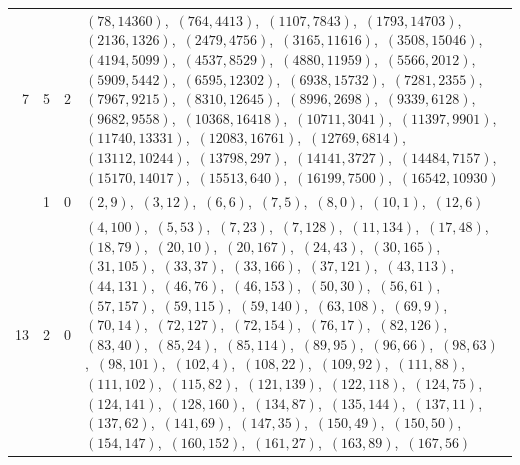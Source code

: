 \documentclass[11pt]{article}
\begin{document}
\begin{longtable}{@{}rrl>{\raggedright\arraybackslash}p{}@{}}
7 & 5 & $2$ & $(78,14360)$,\allowbreak\ $(764,4413)$,\allowbreak\ $(1107,7843)$,\allowbreak\ $(1793,14703)$,\allowbreak\ $(2136,1326)$,\allowbreak\ $(2479,4756)$,\allowbreak\ $(3165,11616)$,\allowbreak\ $(3508,15046)$,\allowbreak\ $(4194,5099)$,\allowbreak\ $(4537,8529)$,\allowbreak\ $(4880,11959)$,\allowbreak\ $(5566,2012)$,\allowbreak\ $(5909,5442)$,\allowbreak\ $(6595,12302)$,\allowbreak\ $(6938,15732)$,\allowbreak\ $(7281,2355)$,\allowbreak\ $(7967,9215)$,\allowbreak\ $(8310,12645)$,\allowbreak\ $(8996,2698)$,\allowbreak\ $(9339,6128)$,\allowbreak\ $(9682,9558)$,\allowbreak\ $(10368,16418)$,\allowbreak\ $(10711,3041)$,\allowbreak\ $(11397,9901)$,\allowbreak\ $(11740,13331)$,\allowbreak\ $(12083,16761)$,\allowbreak\ $(12769,6814)$,\allowbreak\ $(13112,10244)$,\allowbreak\ $(13798,297)$,\allowbreak\ $(14141,3727)$,\allowbreak\ $(14484,7157)$,\allowbreak\ $(15170,14017)$,\allowbreak\ $(15513,640)$,\allowbreak\ $(16199,7500)$,\allowbreak\ $(16542,10930)$\\
\addlinespace[3pt]
13 & 1 & $0$ & $(2,9)$,\allowbreak\ $(3,12)$,\allowbreak\ $(6,6)$,\allowbreak\ $(7,5)$,\allowbreak\ $(8,0)$,\allowbreak\ $(10,1)$,\allowbreak\ $(12,6)$\\
13 & 2 & $0$ & $(4,100)$,\allowbreak\ $(5,53)$,\allowbreak\ $(7,23)$,\allowbreak\ $(7,128)$,\allowbreak\ $(11,134)$,\allowbreak\ $(17,48)$,\allowbreak\ $(18,79)$,\allowbreak\ $(20,10)$,\allowbreak\ $(20,167)$,\allowbreak\ $(24,43)$,\allowbreak\ $(30,165)$,\allowbreak\ $(31,105)$,\allowbreak\ $(33,37)$,\allowbreak\ $(33,166)$,\allowbreak\ $(37,121)$,\allowbreak\ $(43,113)$,\allowbreak\ $(44,131)$,\allowbreak\ $(46,76)$,\allowbreak\ $(46,153)$,\allowbreak\ $(50,30)$,\allowbreak\ $(56,61)$,\allowbreak\ $(57,157)$,\allowbreak\ $(59,115)$,\allowbreak\ $(59,140)$,\allowbreak\ $(63,108)$,\allowbreak\ $(69,9)$,\allowbreak\ $(70,14)$,\allowbreak\ $(72,127)$,\allowbreak\ $(72,154)$,\allowbreak\ $(76,17)$,\allowbreak\ $(82,126)$,\allowbreak\ $(83,40)$,\allowbreak\ $(85,24)$,\allowbreak\ $(85,114)$,\allowbreak\ $(89,95)$,\allowbreak\ $(96,66)$,\allowbreak\ $(98,63)$,\allowbreak\ $(98,101)$,\allowbreak\ $(102,4)$,\allowbreak\ $(108,22)$,\allowbreak\ $(109,92)$,\allowbreak\ $(111,88)$,\allowbreak\ $(111,102)$,\allowbreak\ $(115,82)$,\allowbreak\ $(121,139)$,\allowbreak\ $(122,118)$,\allowbreak\ $(124,75)$,\allowbreak\ $(124,141)$,\allowbreak\ $(128,160)$,\allowbreak\ $(134,87)$,\allowbreak\ $(135,144)$,\allowbreak\ $(137,11)$,\allowbreak\ $(137,62)$,\allowbreak\ $(141,69)$,\allowbreak\ $(147,35)$,\allowbreak\ $(150,49)$,\allowbreak\ $(150,50)$,\allowbreak\ $(154,147)$,\allowbreak\ $(160,152)$,\allowbreak\ $(161,27)$,\allowbreak\ $(163,89)$,\allowbreak\ $(167,56)$\\

\end{longtable}
\end{document}
